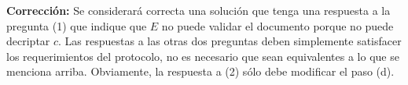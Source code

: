 \textbf{Corrección:} Se considerará correcta una solución que tenga una respuesta a la pregunta (1) que indique que $E$ no puede validar el documento porque no puede decriptar $c$. Las respuestas a las otras dos preguntas deben simplemente satisfacer los requerimientos del protocolo, no es necesario que sean equivalentes a lo que se menciona arriba. Obviamente, la respuesta a (2) sólo debe modificar el paso (d).
